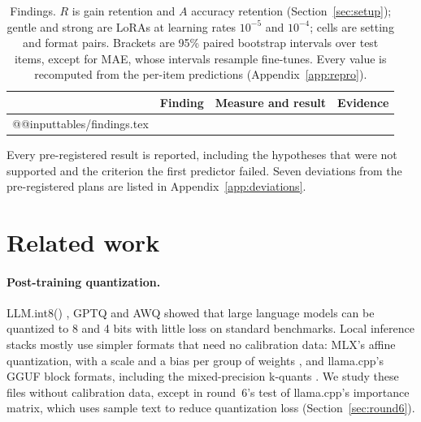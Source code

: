 \documentclass[10pt]{article}
\makeatletter
\newcommand*{\tablerows}[1]{\csname @@input\endcsname #1 }
\makeatother
\begin{document}
\begin{table}[t]
\centering\footnotesize
\caption{Findings. $R$ is gain retention and $A$ accuracy retention (Section~\ref{sec:setup}); gentle and strong are LoRAs at learning rates $10^{-5}$ and $10^{-4}$; cells are setting and format pairs. Brackets are 95\% paired bootstrap intervals over test items, except for MAE, whose intervals resample fine-tunes. Every value is recomputed from the per-item predictions (Appendix~\ref{app:repro}).}
\label{tab:findings}
\setlength{\tabcolsep}{4pt}
\begin{tabularx}{\linewidth}{@{}l>{\raggedright\arraybackslash}p{4.1cm}L>{\raggedright\arraybackslash}p{2.6cm}@{}}
\toprule
& Finding & Measure and result & Evidence \\
\midrule
\tablerows{tables/findings.tex}
\bottomrule
\end{tabularx}
\end{table}

Every pre-registered result is reported, including the hypotheses that were not supported and the criterion the first predictor failed. Seven deviations from the pre-registered plans are listed in Appendix~\ref{app:deviations}.

\section{Related work}
\label{sec:related}

\paragraph{Post-training quantization.} LLM.int8() \citep{dettmers2022llmint8}, GPTQ \citep{frantar2023gptq} and AWQ \citep{lin2024awq} showed that large language models can be quantized to 8 and 4 bits with little loss on standard benchmarks. Local inference stacks mostly use simpler formats that need no calibration data: MLX's affine quantization, with a scale and a bias per group of weights \citep{mlx2023}, and llama.cpp's GGUF block formats, including the mixed-precision k-quants \citep{llamacpp}. We study these files without calibration data, except in round~6's test of llama.cpp's importance matrix, which uses sample text to reduce quantization loss (Section~\ref{sec:round6}).
\end{document}
